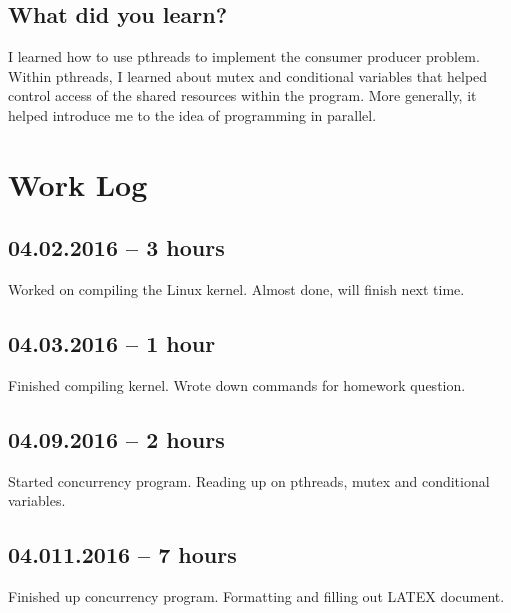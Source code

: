 \documentclass[letterpaper,
10pt, titlepage, draftclsnofoot, onecolumn]{IEEEtran}
\begin{document}
\subsection*{What did you learn?}

I learned how to use pthreads to implement the consumer producer problem. Within pthreads, I learned about mutex and conditional variables that helped control access of the shared resources within the program. More generally, it helped introduce me to the idea of programming in parallel.




\section*{Work Log}
\subsection*{04.02.2016 -- 3 hours}
Worked on compiling the Linux kernel. Almost done, will finish next time.
\subsection*{04.03.2016 -- 1 hour}
Finished compiling kernel. Wrote down commands for homework question.
\subsection*{04.09.2016 -- 2 hours}
Started concurrency program. Reading up on pthreads, mutex and conditional variables.
\subsection*{04.011.2016 -- 7 hours}
Finished up concurrency program. Formatting and filling out LATEX document.
\end{document}
